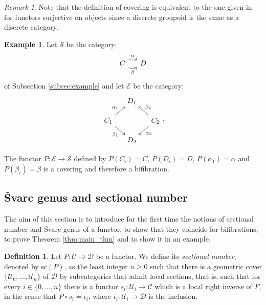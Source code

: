 \documentclass[12pt,reqno]{amsart}
\theoremstyle{definition}
\newtheorem{defi}[teo]{Definition}
\newtheorem{example}[teo]{Example}
\theoremstyle{remark}
\newtheorem{rem}[teo]{Remark}
\numberwithin{figure}{section}%
\newcommand{\CC}{\mathcal{C}}
\newcommand{\co}{\colon}
\newcommand{\Dc}{\mathcal{D}}
\newcommand{\Si}{\mathcal{S}}
\newcommand{\E}{\mathcal{E}}
\newcommand{\sC}{\mathrm{sc}}
\newcommand{\Uc}{\mathcal{U}}
\begin{document}
\begin{rem}
Note that the definition of  covering is equivalent  to the one given in \cite{Tanaka_model_structure} for functors surjective on objects since a discrete groupoid is the same as a discrete category.
\end{rem}

\begin{example}\label{Doblecir}
 Let $\Si$ be the category:
    $$
\begin{tikzcd}[column sep=12pt, row sep=12pt] 
C \arrow[r, "\alpha", bend left] \arrow[r, "\beta"', bend right] & D
\end{tikzcd}
    $$
 of Subsection \ref{subsec:example}   and let $\E$ be the category:
    $$
\begin{tikzcd}[column sep=12pt, row sep=12pt] 
& D_1 &     \\
C_1 \arrow[ru, "\alpha_1"] \arrow[rd, "\beta_1"'] &     & C_2 \arrow[lu, "\beta_2"'] \arrow[ld, "\alpha_2"] \\
    & D_2 &                                                  
\end{tikzcd}.
$$

The functor $P \colon \E \rightarrow \Si$ defined by $P(C_i)=C$, $P(D_i)=D$, $P(\alpha_1)=\alpha$ and $P(\beta_i)=\beta$ is a covering  and therefore a bifibration.
\end{example}

\subsection{\v{S}varc genus and sectional number}

The aim of this section is to introduce for the first time the  notions of sectional number and \v{S}varc genus of a functor; to show that they coincide for bifibrations; to prove Theorem \ref{thm:main_thm}  and to show it in an example. 


\begin{defi}
    Let $P\co \CC \rightarrow \Dc$ be a functor. We define its \emph{sectional number}, denoted by $\sC (P)$, as  the least integer $n\geq 0$ such that there is a geometric cover $\{\Uc_0, \ldots, \Uc_n \}$ of $\Dc$ by subcategories that admit local sections, that is, such that for every $i \in \{0, \ldots, n\} $ there is a functor $s_i \colon \Uc_i \rightarrow \CC$ which is a local right inverse of $F$,  in the sense that $P \circ s_i = \iota_i$, where $\iota_i \colon \Uc_i \rightarrow \Dc$ is the inclusion.
\end{defi}
\end{document}
